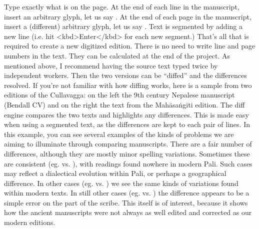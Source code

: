 Type exactly what is on the page.\markdownRendererOlItemEnd 
{}At the end of each line in the manuscript, insert an arbitrary glyph, let us say \markdownRendererCodeSpan{\markdownRendererDollarSign{}}.\markdownRendererOlItemEnd 
{}At the end of each page in the manuscript, insert a (different) arbitrary glyph, let us say \markdownRendererCodeSpan{\markdownRendererHash{}}.\markdownRendererOlItemEnd 
{}Text is segmented by adding a new line (i.e. hit <kbd>Enter</kbd> for each new segment.)\markdownRendererOlItemEnd 
\markdownRendererOlEnd \markdownRendererInterblockSeparator
{}That’s all that is required to create a new digitized edition.\markdownRendererInterblockSeparator
{}There is no need to write line and page numbers in the text. They can be calculated at the end of the project.\markdownRendererInterblockSeparator
{}As mentioned above, I recommend having the source text typed twice by independent workers. Then the two versions can be “diffed” and the differences resolved. If you’re not familiar with how diffing works, here is a sample from two editions of the Cullavagga: on the left the 9th century Nepalese manuscript (Bendall CV) and on the right the text from the Mahāsaṅgīti edition.\markdownRendererInterblockSeparator
{}\markdownRendererInterblockSeparator
{}The diff engine compares the two texts and highlights any differences. This is made easy when using a segmented text, as the differences are kept to each pair of lines.\markdownRendererInterblockSeparator
{}In this example, you can see several examples of the kinds of problems we are aiming to illuminate through comparing manuscripts. There are a fair number of differences, although they are mostly minor spelling variations. Sometimes these are consistent (eg.  vs. ), with readings found nowhere in modern Pali. Such cases may reflect a dialectical evolution within Pali, or perhaps a geographical difference. In other cases (eg.  vs. ) we see the same kinds of variations found within modern texts. In still other cases (eg.  vs. ) the difference appears to be a simple error on the part of the scribe. This itself is of interest, because it shows how the ancient manuscripts were not always as well edited and corrected as our modern editions.\markdownRendererInterblockSeparator
